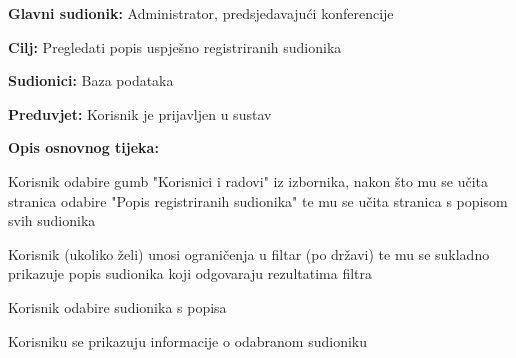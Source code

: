 					\noindent {}
					\begin{packed_item}
	
						\item \textbf{Glavni sudionik: } Administrator, predsjedavajući konferencije
						\item  \textbf{Cilj:} Pregledati popis uspješno registriranih sudionika
						\item  \textbf{Sudionici:} Baza podataka
						\item  \textbf{Preduvjet:} Korisnik je prijavljen u sustav
						\item  \textbf{Opis osnovnog tijeka:}
						
						\item[] \begin{packed_enum}
	
							\item Korisnik odabire gumb "Korisnici i radovi" iz izbornika, nakon što mu se učita stranica odabire "Popis registriranih sudionika" te mu se učita stranica s popisom svih sudionika
							\item Korisnik (ukoliko želi) unosi ograničenja u filtar (po državi) te mu se sukladno prikazuje popis sudionika koji odgovaraju rezultatima filtra
							\item Korisnik odabire sudionika s popisa
							\item Korisniku se prikazuju informacije o odabranom sudioniku

					
						\end{packed_enum}
			
					\end{packed_item}

